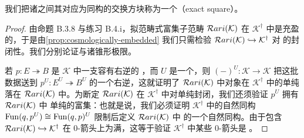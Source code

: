 我们把诸\trRightAdjoint{}之间其对应为同构的交换方块称为一个\textbf{\trExactSquare}（exact
square）。

\begin{proof}
由命题 B.3.8 与练习 B.4.i，拟范畴式富集子范畴 $\mathcal{R}ari(\mathcal{K})$ 在
$\mathcal{K}^{\dagger}$ 中是充盈的，于是由\cref{prop:cosmologically-embedded}
我们只需检验 $\mathcal{R}ari(\mathcal{K})\hookrightarrow\mathcal{K}^{\dagger}$ 对%
\trFlexibleWeightedLimit{}的封闭性。我们分别论证\trCotensor{}与诸锥形极限。

若 $p\colon E\twoheadrightarrow B$ 是 $\mathcal{K}$ 中一支容有\trRightAdjoint{}右逆的%
\trIsofibration{}，而 $U$ 是一个\trSimplicialSet{}，则\trCosmologicalFunctor{}
$(-)^{U}\colon\mathcal{K}\to\mathcal{K}$ 把这批数据送到
$p^{U}\colon E^{U}\twoheadrightarrow B^{U}$ 的一个\trRightAdjoint{}右逆，这就证明了
$\mathcal{R}ari(\mathcal{K})$ 中对象在 $\mathcal{K}^{\dagger}$ 中的单纯\trCotensor{}%
落在 $\mathcal{R}ari(\mathcal{K})$ 中。为断定 $\mathcal{R}ari(\mathcal{K})$ 在 $\mathcal{K}^{\dagger}$
中对单纯\trCotensor{}封闭，我们还须验证 $p^{U}$ 拥有 $\mathcal{R}ari(\mathcal{K})$ 中
单纯\trCotensor{}的富集\trUniversalProperty{}：也就是说，我们必须证明
$\mathcal{K}^{\dagger}$ 中\trFunctorSpace{}的自然同构
$\operatorname{Fun}(q,p^{U})\cong\operatorname{Fun}(q,p)^{U}$ 限制后定义 $\mathcal{R}ari(\mathcal{K})$ 中%
\trFunctorSpace{}的一个自然同构。由于包含 $\mathcal{R}ari(\mathcal{K})\hookrightarrow\mathcal{K}^{\dagger}$
在 0-箭头上为满，这等于验证 $\mathcal{K}^{\dagger}$ 中某些 0-箭头是%
\trExactSquare{}。


\end{proof}
